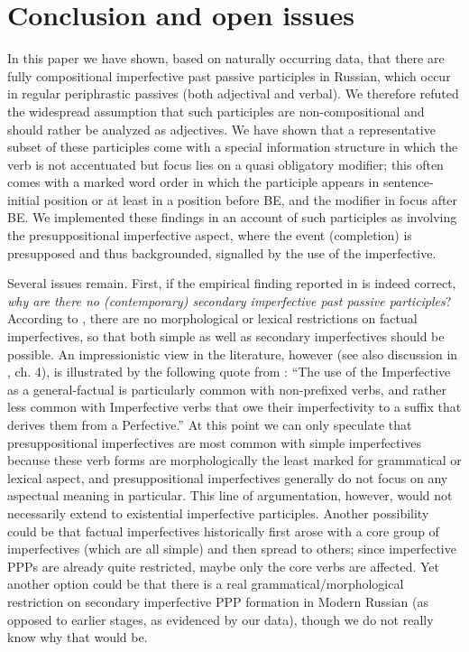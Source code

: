 \documentclass[output=paper,modfonts,newtxmath,hidelinks
]{langscibook}
\begin{document}
\section{Conclusion and open issues}
\label{concl}

In this paper we have shown, based on naturally occurring data, that there are fully compositional imperfective past passive participles in Russian, which occur in regular periphrastic passives (both adjectival and verbal). We therefore refuted the widespread assumption that such participles are non-compositional and should rather be analyzed as adjectives. We have shown that a representative subset of these participles come with a special information structure in which the verb is not accentuated but focus lies on a quasi obligatory modifier; this often comes with a marked word order in which the participle appears in sentence-initial position or at least in a position before BE, and the modifier in focus after BE. We implemented these findings in an account of such participles as involving the presuppositional imperfective aspect, where the event (completion) is presupposed and thus backgrounded, signalled by the use of the imperfective.

Several issues remain. First, if the empirical finding reported in  is indeed correct, \textit{why are there no (contemporary) secondary imperfective past passive participles}? According to \citet{gronndiss}, there are no morphological or lexical restrictions on factual imperfectives, so that both simple as well as secondary imperfectives should be possible. An impressionistic view in the literature, however (see also discussion in \citealt{gronndiss}, ch. 4), is illustrated by the following quote from \citet[][118]{comrie76}: ``The use of the Imperfective as a general-factual is particularly common with non-prefixed verbs, and rather less common with Imperfective verbs that owe their imperfectivity to a suffix that derives them from a Perfective.'' At this point we can only speculate that presuppositional imperfectives are most common with simple imperfectives because these verb forms are morphologically the least marked for grammatical or lexical aspect, and presuppositional imperfectives  generally do not focus on any aspectual meaning in particular. This line of argumentation, however, would not necessarily extend to existential imperfective participles. Another possibility could be that factual imperfectives historically first arose with a core group of imperfectives (which are all simple) and then spread to others; since imperfective PPPs are already quite restricted, maybe only the core verbs are affected. Yet another option could be that there is a real grammatical/morphological restriction on secondary imperfective PPP formation in Modern Russian (as opposed to earlier stages, as evidenced by our data), though we do not really know why that would be.
\end{document}
